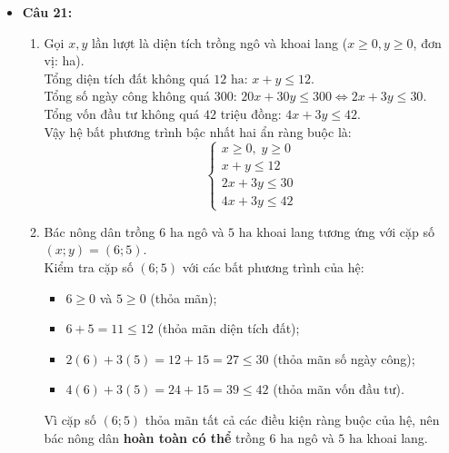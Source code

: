 \documentclass[12pt,a4paper]{article}
\begin{document}
\begin{itemize}[leftmargin=0.6cm, itemsep=2pt, topsep=1pt]
    \item \textbf{Câu 21:}
    \begin{enumerate}[label=\alph*), itemsep=1pt]
        \item Gọi $x, y$ lần lượt là diện tích trồng ngô và khoai lang ($x \ge 0, y \ge 0$, đơn vị: ha).\\
        Tổng diện tích đất không quá $12\text{ ha}$: $x + y \le 12$.\\
        Tổng số ngày công không quá $300$: $20x + 30y \le 300 \iff 2x + 3y \le 30$.\\
        Tổng vốn đầu tư không quá $42$ triệu đồng: $4x + 3y \le 42$.\\
        Vậy hệ bất phương trình bậc nhất hai ẩn ràng buộc là:
        \[
        \begin{cases} x \ge 0,\; y \ge 0 \\ x + y \le 12 \\ 2x + 3y \le 30 \\ 4x + 3y \le 42 \end{cases}
        \]
        \item Bác nông dân trồng $6\text{ ha}$ ngô và $5\text{ ha}$ khoai lang tương ứng với cặp số $(x; y) = (6; 5)$.\\
        Kiểm tra cặp số $(6; 5)$ với các bất phương trình của hệ:
        \begin{itemize}[itemsep=0.5pt]
            \item $6 \ge 0$ và $5 \ge 0$ (thỏa mãn);
            \item $6 + 5 = 11 \le 12$ (thỏa mãn diện tích đất);
            \item $2(6) + 3(5) = 12 + 15 = 27 \le 30$ (thỏa mãn số ngày công);
            \item $4(6) + 3(5) = 24 + 15 = 39 \le 42$ (thỏa mãn vốn đầu tư).
        \end{itemize}
        Vì cặp số $(6; 5)$ thỏa mãn tất cả các điều kiện ràng buộc của hệ, nên bác nông dân \textbf{hoàn toàn có thể} trồng $6\text{ ha}$ ngô và $5\text{ ha}$ khoai lang.
    \end{enumerate}


\end{itemize}
\end{document}
